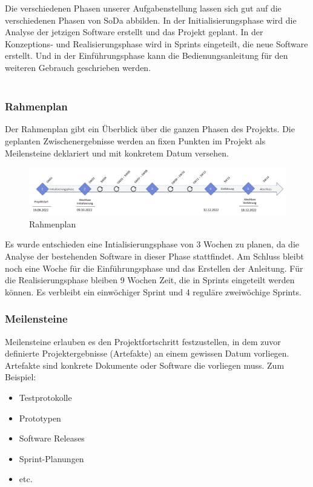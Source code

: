 \documentclass[a4paper, table]{article}
\begin{document}
Die verschiedenen Phasen unserer Aufgabenstellung lassen sich gut auf die verschiedenen Phasen von \gls{SoDa} abbilden.
In der Initialisierungsphase wird die Analyse der jetzigen Software erstellt und das Projekt geplant.
In der Konzeptions- und Realisierungsphase wird in Sprints eingeteilt, die neue Software erstellt.
Und in der Einführungsphase kann die Bedienungsanleitung für den weiteren Gebrauch geschrieben werden.\\\\

\subsubsection{Rahmenplan}
Der Rahmenplan gibt ein Überblick über die ganzen Phasen des Projekts.
Die geplanten Zwischenergebnisse werden an fixen Punkten im Projekt als Meilensteine deklariert und mit konkretem Datum versehen.

\begin{figure}[h]
    \centering
    \hspace*{-2cm}
    \includegraphics[width=1.3\textwidth]{img/Rahmenplan.jpg}
    \caption{Rahmenplan}
    \label{fig:Rahmenplan}
\end{figure}
Es wurde entschieden eine Intialisierungsphase von 3 Wochen zu planen, da die Analyse der bestehenden Software in dieser Phase stattfindet.
Am Schluss bleibt noch eine Woche für die Einführungsphase und das Erstellen der Anleitung.
Für die Realisierungsphase bleiben 9 Wochen Zeit, die in Sprints eingeteilt werden können.
Es verbleibt ein einwöchiger Sprint und 4 reguläre zweiwöchige Sprints.
\newpage
\subsubsection*{Meilensteine}
Meilensteine erlauben es den Projektfortschritt festzustellen,
in dem zuvor definierte Projektergebnisse (Artefakte) an einem gewissen Datum vorliegen.\\
Artefakte sind konkrete Dokumente oder Software die vorliegen muss. Zum Beispiel:
\begin{itemize}
    \item Testprotokolle
    \item Prototypen
    \item Software Releases
    \item Sprint-Planungen
    \item etc.
\end{itemize}
\end{document}

